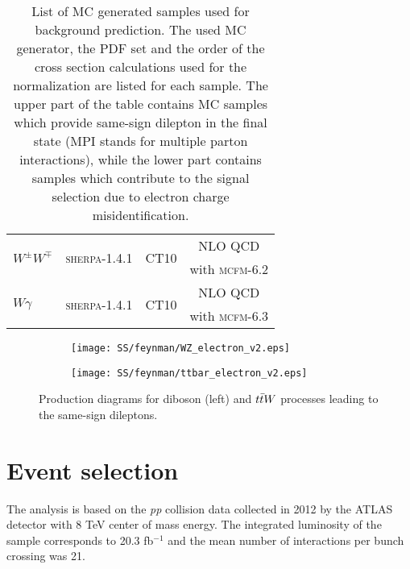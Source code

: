 \begin{table}[ht]
\begin{center}
\begin{tabular}{l|c|c|c}
\multirow{2}{*}{$W^{\pm}W^{\mp}$} & \multirow{2}{*}{{\scshape sherpa-1.4.1}} & \multirow{2}{*}{CT10}& NLO QCD \\
& &  & with {\scshape mcfm-6.2}\\
\hline
\multirow{2}{*}{$W\gamma$} & \multirow{2}{*}{{\scshape sherpa}-1.4.1} & \multirow{2}{*}{CT10}& NLO QCD\\
& &  & with {\scshape mcfm-6.3}\\
\hline
\end{tabular}
\end{center}
  \caption{List of MC generated samples used for background prediction. 
  The used MC generator, the PDF set and the order of the cross section calculations used for the normalization are listed for each sample.
  The upper part of the table contains MC samples which provide same-sign dilepton in the final state
  (MPI stands for multiple parton interactions), 
  while the lower part contains samples which contribute to the signal selection due to electron charge misidentification.}
\label{tab:MC_cross}
\end{table}

\begin{figure}

\begin{subfigure}{.5\textwidth}
  \centering
  \texttt{[image: SS/feynman/WZ\_electron\_v2.eps]}
\end{subfigure}%
\begin{subfigure}{.5\textwidth}
  \centering
  \texttt{[image: SS/feynman/ttbar\_electron\_v2.eps]}
\end{subfigure}

\caption{Production diagrams for diboson (left) and $t\bar{t} W$ processes leading to the same-sign dileptons.}
  \label{fig:prompt_bkg_feynman_diag}
\end{figure}

\section{Event selection}

The analysis is based on the \textit{pp} collision data collected in 2012 by the ATLAS detector with 8 TeV center of mass energy.
The integrated luminosity of the sample corresponds to 20.3 fb$^{-1}$ and the mean number of interactions per bunch crossing was 21.

